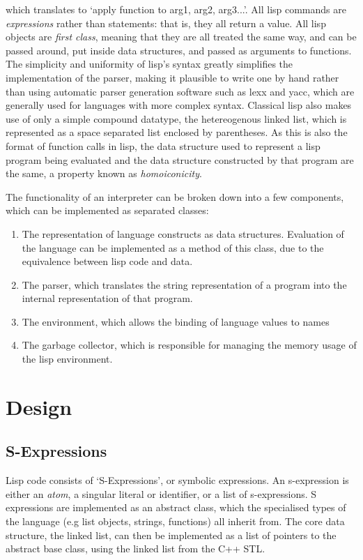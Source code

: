 \documentclass[12pt]{article}
\begin{document}
which translates to `apply function to arg1, arg2, arg3...'. All lisp commands are \textit{expressions} rather than statements: that is, they all return a value. All lisp objects are \textit{first class}, meaning that they are all treated the same way, and can be passed around, put inside data structures, and passed as arguments to functions.
The simplicity and uniformity of lisp's syntax greatly simplifies the implementation of the parser, making it plausible to write one by hand rather than
using automatic parser generation software such as lexx and yacc, which are generally used for languages with more complex syntax. Classical lisp
also makes use of only a simple compound datatype, the hetereogenous linked list, which is represented as a space separated list enclosed by parentheses. As this is also the format of function calls in lisp, the data structure used
to represent a lisp program being evaluated and the data structure constructed
by that program are the same, a property known as \textit{homoiconicity}.

The functionality of an interpreter can be broken down into a few components, which can be implemented as separated classes:
\begin{enumerate}
\item The representation of language constructs as data structures. Evaluation of the language can be implemented as a method of this class, due to the
equivalence between lisp code and data.
\item The parser, which translates the string representation of a program into the internal representation of that program.
\item The environment, which allows the binding of language values to names
\item The garbage collector, which is responsible for managing the memory usage of the lisp environment.
\end{enumerate}

\section{Design}
\subsection{S-Expressions}
\label{section:sexp}

Lisp code consists of `S-Expressions', or symbolic expressions. An s-expression
is either an \textit{atom}, a singular literal or identifier, or a list of
s-expressions. S expressions are implemented as an abstract class, which the
specialised types of the language (e.g list objects, strings, functions) all
inherit from. The core data structure, the linked list, can then be implemented
as a list of pointers to the abstract base class, using the linked list from the C++ STL.
\end{document}
